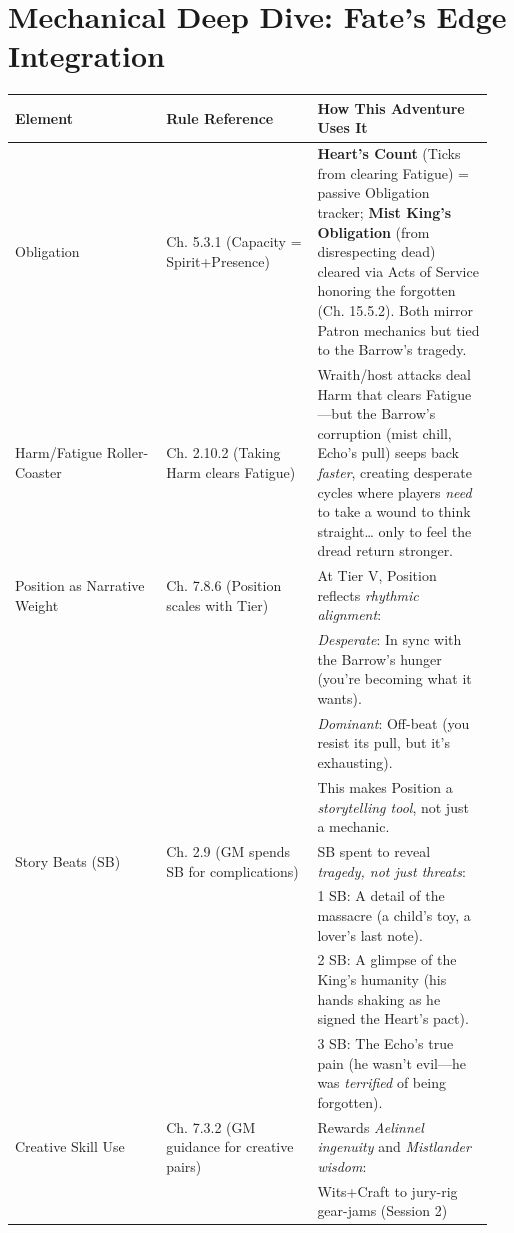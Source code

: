 \documentclass[12pt]{article}
\begin{document}
\section{Mechanical Deep Dive: Fate's Edge Integration}
\begin{tabular}{|p{0.3\linewidth}|p{0.3\linewidth}|p{0.35\linewidth}|}
\hline
\textbf{Element} & \textbf{Rule Reference} & \textbf{How This Adventure Uses It} \\
\hline
Obligation & Ch. 5.3.1 (Capacity = Spirit+Presence) & \textbf{Heart's Count} (Ticks from clearing Fatigue) = passive Obligation tracker; \textbf{Mist King's Obligation} (from disrespecting dead) cleared via Acts of Service honoring the forgotten (Ch. 15.5.2). Both mirror Patron mechanics but tied to the Barrow's tragedy. \\
\hline
Harm/Fatigue Roller-Coaster & Ch. 2.10.2 (Taking Harm clears Fatigue) & Wraith/host attacks deal Harm that clears Fatigue---but the Barrow's corruption (mist chill, Echo's pull) seeps back \textit{faster}, creating desperate cycles where players \textit{need} to take a wound to think straight\ldots{} only to feel the dread return stronger. \\
\hline
Position as Narrative Weight & Ch. 7.8.6 (Position scales with Tier) & At Tier V, Position reflects \textit{rhythmic alignment}: \\
 & & \textit{Desperate}: In sync with the Barrow's hunger (you're becoming what it wants). \\
 & & \textit{Dominant}: Off-beat (you resist its pull, but it's exhausting). \\
 & & This makes Position a \textit{storytelling tool}, not just a mechanic. \\
\hline
Story Beats (SB) & Ch. 2.9 (GM spends SB for complications) & SB spent to reveal \textit{tragedy, not just threats}: \\
 & & 1 SB: A detail of the massacre (a child's toy, a lover's last note). \\
 & & 2 SB: A glimpse of the King's humanity (his hands shaking as he signed the Heart's pact). \\
 & & 3 SB: The Echo's true pain (he wasn't evil---he was \textit{terrified} of being forgotten). \\
\hline
Creative Skill Use & Ch. 7.3.2 (GM guidance for creative pairs) & Rewards \textit{Aelinnel ingenuity} and \textit{Mistlander wisdom}: \\
 & & Wits+Craft to jury-rig gear-jams (Session 2) \\

\end{tabular}
\end{document}
